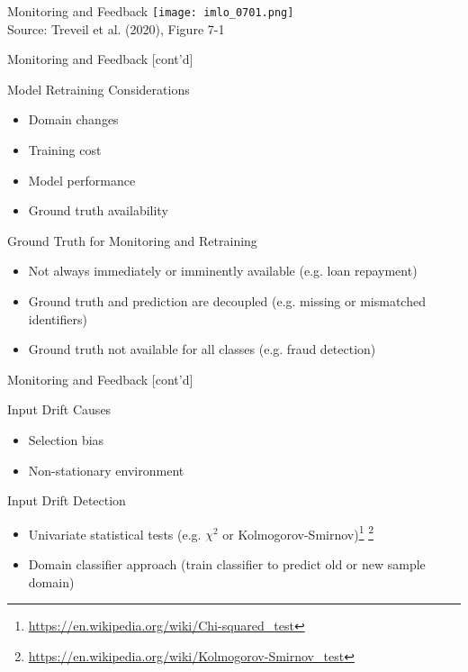 \documentclass[ignorenonframetext,xcolor=x11names]{beamer}
\begin{document}
\begin{frame}{Monitoring and Feedback}
\centering
\texttt{[image: imlo\_0701.png]} \\

\vspace{\baselineskip}
\scriptsize Source: Treveil et al. (2020), Figure 7-1
\end{frame}

\begin{frame}{Monitoring and Feedback \small [cont'd]}
\begin{block}{Model Retraining Considerations}
\begin{itemize}
   \item Domain changes
   \item Training cost
   \item Model performance
   \item Ground truth availability
\end{itemize}
\end{block}
\begin{block}{Ground Truth for Monitoring and Retraining}
\begin{itemize}
   \item Not always immediately or imminently available (e.g. loan repayment)
   \item Ground truth and prediction are decoupled (e.g. missing or mismatched identifiers)
   \item Ground truth not available for all classes (e.g. fraud detection)
\end{itemize}
\end{block}
\end{frame}

\begin{frame}{Monitoring and Feedback \small [cont'd]}
\begin{block}{Input Drift Causes}
\begin{itemize}
   \item Selection bias
   \item Non-stationary environment
\end{itemize}
\end{block}
\begin{block}{Input Drift Detection}
\begin{itemize}
   \item Univariate statistical tests (e.g. $\chi^2$ or Kolmogorov-Smirnov)\footnote{\url{https://en.wikipedia.org/wiki/Chi-squared_test}} \footnote{\url{https://en.wikipedia.org/wiki/Kolmogorov-Smirnov_test}}
   \item Domain classifier approach (train classifier to predict old or new sample domain)
\end{itemize}
\end{block}
\end{frame}
\end{document}
